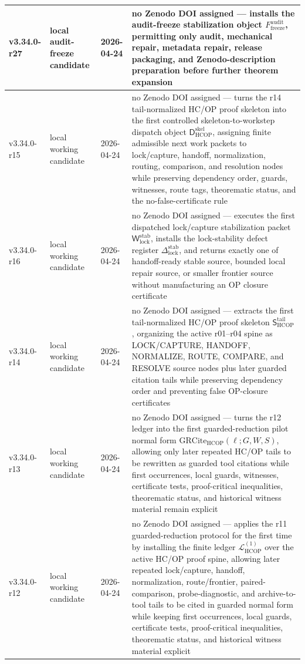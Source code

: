 {\begin{longtable}{|p{}|p{}|p{}|p{}|}
v3.34.0-r27 & local audit-freeze candidate & 2026-04-24 & no Zenodo DOI assigned --- installs the audit-freeze stabilization object \(F_{\mathrm{freeze}}^{\mathrm{audit}}\), permitting only audit, mechanical repair, metadata repair, release packaging, and Zenodo-description preparation before further theorem expansion \\
\hline
v3.34.0-r15 & local working candidate & 2026-04-24 & no Zenodo DOI assigned --- turns the r14 tail-normalized HC/OP proof skeleton into the first controlled skeleton-to-workstep dispatch object \(\mathsf D_{\mathrm{HCOP}}^{\mathrm{skel}}\), assigning finite admissible next work packets to lock/capture, handoff, normalization, routing, comparison, and resolution nodes while preserving dependency order, guards, witnesses, route tags, theorematic status, and the no-false-certificate rule \\
v3.34.0-r16 & local working candidate & 2026-04-24 & no Zenodo DOI assigned --- executes the first dispatched lock/capture stabilization packet \(\mathsf W_{\mathrm{lock}}^{\mathrm{stab}}\), installs the lock-stability defect register \(\Delta_{\mathrm{lock}}^{\mathrm{stab}}\), and returns exactly one of handoff-ready stable source, bounded local repair source, or smaller frontier source without manufacturing an OP closure certificate \\
\hline
v3.34.0-r14 & local working candidate & 2026-04-24 & no Zenodo DOI assigned --- extracts the first tail-normalized HC/OP proof skeleton \(\mathsf S_{\mathrm{HCOP}}^{\mathrm{tail}}\), organizing the active r01--r04 spine as LOCK/CAPTURE, HANDOFF, NORMALIZE, ROUTE, COMPARE, and RESOLVE source nodes plus later guarded citation tails while preserving dependency order and preventing false OP-closure certificates \\
\hline
v3.34.0-r13 & local working candidate & 2026-04-24 & no Zenodo DOI assigned --- turns the r12 ledger into the first guarded-reduction pilot normal form \(\mathrm{GRCite}_{\mathrm{HCOP}}(\ell;G,W,S)\), allowing only later repeated HC/OP tails to be rewritten as guarded tool citations while first occurrences, local guards, witnesses, certificate tests, proof-critical inequalities, theorematic status, and historical witness material remain explicit \\
\hline
v3.34.0-r12 & local working candidate & 2026-04-24 & no Zenodo DOI assigned --- applies the r11 guarded-reduction protocol for the first time by installing the finite ledger \(\mathcal L_{\mathrm{HCOP}}^{(1)}\) over the active HC/OP proof spine, allowing later repeated lock/capture, handoff, normalization, route/frontier, paired-comparison, probe-diagnostic, and archive-to-tool tails to be cited in guarded normal form while keeping first occurrences, local guards, certificate tests, proof-critical inequalities, theorematic status, and historical witness material explicit \\

\end{longtable}}
